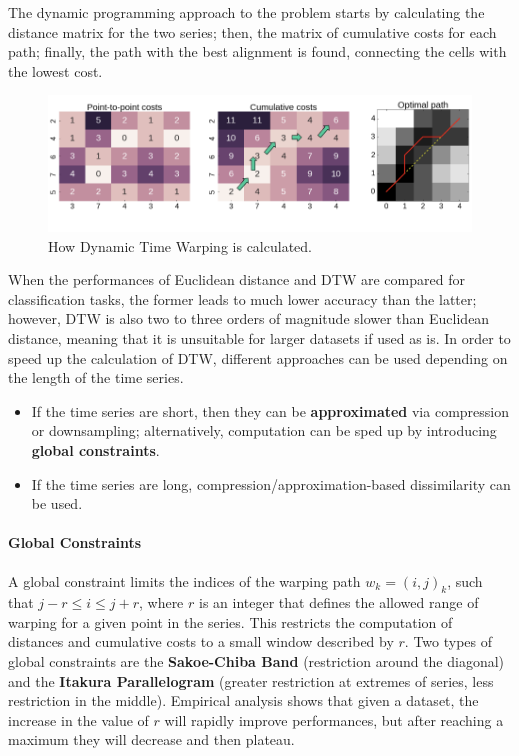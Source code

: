 The dynamic programming approach to the problem starts by calculating the distance matrix for the two series; then, the matrix of cumulative costs for each path; finally, the path with the best alignment is found, connecting the cells with the lowest cost.
\begin{figure}[h]
    \centering
    \includegraphics[width=1.0\linewidth]{img/dtw.png}
    \caption{How Dynamic Time Warping is calculated.}
    \label{fig:dtw}
\end{figure}

When the performances of Euclidean distance and DTW are compared for classification tasks, the former leads to much lower accuracy than the latter; however, DTW is also two to three orders of magnitude slower than Euclidean distance, meaning that it is unsuitable for larger datasets if used as is. In order to speed up the calculation of DTW, different approaches can be used depending on the length of the time series.

\begin{itemize}
    \item If the time series are short, then they can be \textbf{approximated} via compression or downsampling; alternatively, computation can be sped up by introducing \textbf{global constraints}.
    
    \item If the time series are long, compression/approximation-based dissimilarity can be used.
\end{itemize}

\paragraph{Global Constraints}

A global constraint limits the indices of the warping path $w_k = (i,j)_k$, such that $j-r \leq i \leq j+r$, where $r$ is an integer that defines the allowed range of warping for a given point in the series. This restricts the computation of distances and cumulative costs to a small window described by $r$. Two types of global constraints are the \textbf{Sakoe-Chiba Band} (restriction around the diagonal) and the \textbf{Itakura Parallelogram} (greater restriction at extremes of series, less restriction in the middle). Empirical analysis shows that given a dataset, the increase in the value of $r$ will rapidly improve performances, but after reaching a maximum they will decrease and then plateau.

